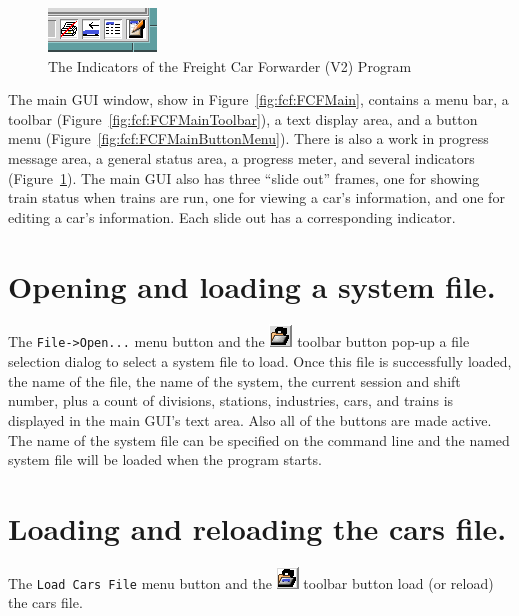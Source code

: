\begin{figure}[hbpt]
\begin{centering}
\includegraphics{FCFMainIndicators.png}
\caption{The Indicators of the Freight Car Forwarder (V2) Program}
\label{fig:fcf:FCFMainIndicators}
\end{centering}
\end{figure}
The main GUI window, show in
Figure~\ref{fig:fcf:FCFMain}, contains a menu bar, a toolbar
(Figure~\ref{fig:fcf:FCFMainToolbar}), a text display area, and a
button menu (Figure~\ref{fig:fcf:FCFMainButtonMenu}). There is also a 
work in progress message area, a  general status area, a progress
meter, and several indicators (Figure~\ref{fig:fcf:FCFMainIndicators}).
The main GUI also has three ``slide out'' frames, one for showing train
status when trains are run, one for viewing a car's information, and
one for editing a car's information. Each slide out has a corresponding
indicator. 

\section{Opening and loading a system file.}
\label{sect:fcf:loadsystem}

The \verb=File->Open...= menu button and the
\includegraphics{FCFLoadTool.png} toolbar button pop-up a file selection
dialog to select a system file to load. Once this file is successfully
loaded, the name of the file, the name of the system, the current
session and shift number, plus a count of  divisions, stations,
industries, cars, and trains is displayed in the main GUI's text area. 
Also all of the buttons are made active.  The name of the system file
can be specified on the command line and the named system file will be
loaded when the program starts.

\section{Loading and reloading the cars file.}

The \verb=Load Cars File= menu button and the
\includegraphics{FCFLoadCarsTool.png} toolbar button load (or reload)
the cars file.

